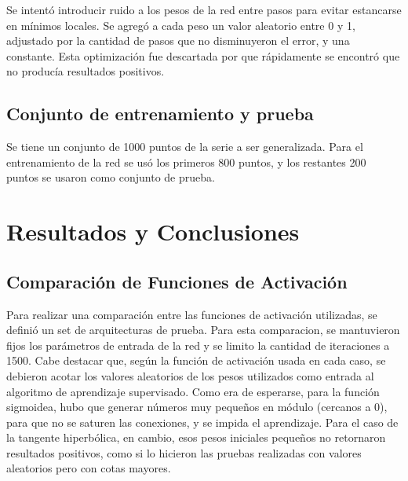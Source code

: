 \documentclass[a4paper,10pt]{article}
\begin{document}
        Se intentó introducir ruido a los pesos de la red entre pasos para evitar estancarse en mínimos locales.
        Se agregó a cada peso un valor aleatorio entre 0 y 1, adjustado por la cantidad de pasos que no disminuyeron el error, y una constante.
        Esta optimización fue descartada por que rápidamente se encontró que no producía resultados positivos.

    \subsection{Conjunto de entrenamiento y prueba}

    Se tiene un conjunto de 1000 puntos de la serie a ser generalizada.
    Para el entrenamiento de la red se usó los primeros 800 puntos, y los restantes 200 puntos se usaron como conjunto de prueba.

\section{Resultados y Conclusiones}

    \subsection{Comparación de Funciones de Activación}
    \label{sec:comparacion-activacion}

    Para realizar una comparación entre las funciones de activación utilizadas, se definió un set de arquitecturas de prueba. Para esta comparacion, se mantuvieron fijos los parámetros de entrada de la red y se limito la cantidad de iteraciones a 1500.
    Cabe destacar que, según la función de activación usada en cada caso, se debieron acotar los valores aleatorios de los pesos utilizados como entrada al algoritmo de aprendizaje
    supervisado. Como era de esperarse, para la función sigmoidea, hubo que generar números muy pequeños en módulo (cercanos a 0), para que no se saturen las conexiones, y se impida el aprendizaje.
    Para el caso de la tangente hiperbólica, en cambio, esos pesos  iniciales pequeños no retornaron resultados positivos, como si lo hicieron las pruebas realizadas con valores 
    aleatorios pero con cotas mayores.
\end{document}
